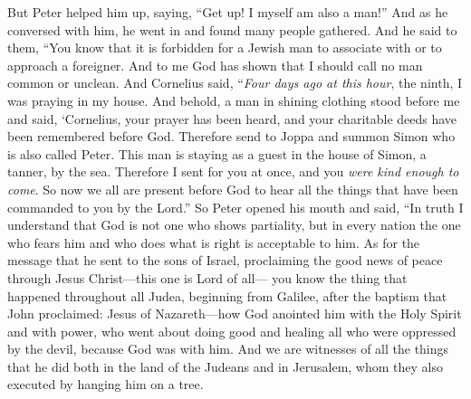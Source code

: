 \begin{biblechapter}
\verse But Peter helped him up, saying, “Get up! I myself am also a man!”
\verse And as he conversed with him, he went in and found many people gathered.
\verse And he said to them, “You know that it is forbidden for a Jewish man to associate with or to approach a foreigner. And to me God has shown that I should call no man common or unclean.
\verse And Cornelius said, “\textit{Four days ago at this hour}, the ninth, I was praying in my house. And behold, a man in shining clothing stood before me
\verse and said, ‘Cornelius, your prayer has been heard, and your charitable deeds have been remembered before God.
\verse Therefore send to Joppa and summon Simon who is also called Peter. This man is staying as a guest in the house of Simon, a tanner, by the sea.
\verse Therefore I sent for you at once, and you \textit{were kind enough to come}. So now we all are present before God to hear all the things that have been commanded to you by the Lord.”
\verse So Peter opened his mouth and said, “In truth I understand that God is not one who shows partiality,
\verse but in every nation the one who fears him and who does what is right is acceptable to him.
\verse As for the message that he sent to the sons of Israel, proclaiming the good news of peace through Jesus Christ—this one is Lord of all—
\verse you know the thing that happened throughout all Judea, beginning from Galilee, after the baptism that John proclaimed:
\verse Jesus of Nazareth—how God anointed him with the Holy Spirit and with power, who went about doing good and healing all who were oppressed by the devil, because God was with him.
\verse And we are witnesses of all the things that he did both in the land of the Judeans and in Jerusalem, whom they also executed by hanging him on a tree.

\end{biblechapter}
